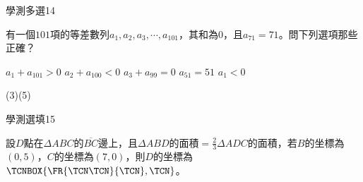 \begin{QUESTIONS}
\begin{QUESTION}
\begin{ExamInfo}{85}{學測}{多選}{14}
        \end{ExamInfo}
        \begin{ExamAnsRateInfo}{}{}{}{}
        \end{ExamAnsRateInfo}
        \begin{QBODY}
            有一個$101$項的等差數列${{a}_{1}},{{a}_{2}},{{a}_{3}},\cdots ,{{a}_{101}}$，其和為$0$，且${{a}_{71}}=71$。問下列選項那些正確？
            \begin{QOPS} 
 \QOP${{a}_{1}}+{{a}_{101}}>0$
            \QOP${{a}_{2}}+{{a}_{100}}<0$
            \QOP${{a}_{3}}+{{a}_{99}}=0$
            \QOP${{a}_{51}}=51$
            \QOP${{a}_{1}}<0$
            \end{QOPS}            
        \end{QBODY}
        \begin{QFROMS}
        \end{QFROMS}
        \begin{QTAGS}\end{QTAGS}
        \begin{QANS}
            (3)(5)
        \end{QANS}
        \begin{QSOLLIST}
        \end{QSOLLIST}
        \begin{QEMPTYSPACE}
        \end{QEMPTYSPACE}
    \end{QUESTION}
\end{QUESTIONS}\begin{QUESTIONS}
    \begin{QUESTION}
        \begin{ExamInfo}{85}{學測}{選填}{15}
        \end{ExamInfo}
        \begin{ExamAnsRateInfo}{}{}{}{}
        \end{ExamAnsRateInfo}
        \begin{QBODY}
            設$D$點在$\Delta ABC$的$\overline{BC}$邊上，且$\Delta ABD$的面積$=\frac{2}{3}\Delta ADC$的面積，若$B$的坐標為$\left( 0,5 \right)$，$C$的坐標為$\left( 7,0 \right)$，則$D$的坐標為 $\TCNBOX{\FR{\TCN\TCN}{\TCN}, \TCN}$。
        \end{QBODY}
        \begin{QFROMS}
        \end{QFROMS}
        \begin{QTAGS}\end{QTAGS}
        \begin{QANS}

\end{QANS}
\end{QUESTION}
\end{QUESTIONS}

